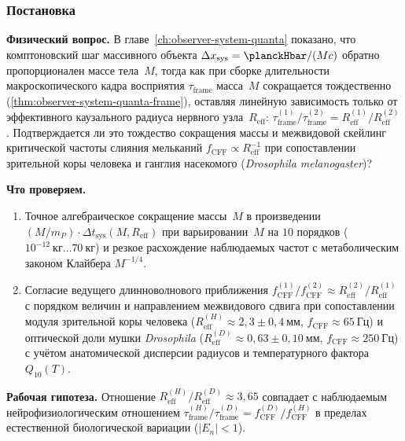 \label{exp:ceo01}

\subsubsection*{Постановка}
\textbf{Физический вопрос.}
В главе~\ref{ch:observer-system-quanta} показано, что комптоновский шаг массивного объекта $\Delta x_{\mathrm{sys}} = \planckHbar/(M c)$ обратно пропорционален массе тела~$M$, тогда как при сборке длительности макроскопического кадра восприятия $\tau_{\mathrm{frame}}$ масса~$M$ сокращается тождественно (\cref{thm:observer-system-quanta-frame}), оставляя линейную зависимость только от эффективного каузального радиуса нервного узла~$R_{\mathrm{eff}}$: $\tau_{\mathrm{frame}}^{(1)}/\tau_{\mathrm{frame}}^{(2)} = R_{\mathrm{eff}}^{(1)}/R_{\mathrm{eff}}^{(2)}$.
Подтверждается ли это тождество сокращения массы и межвидовой скейлинг критической частоты слияния мельканий $f_{\mathrm{CFF}} \propto R_{\mathrm{eff}}^{-1}$ при сопоставлении зрительной коры человека и ганглия насекомого (\emph{Drosophila melanogaster})?

\textbf{Что проверяем.}
\begin{enumerate}[label=\textbf{(\alph*)},leftmargin=*,itemsep=0.25em]
\item Точное алгебраическое сокращение массы~$M$ в произведении $(M/m_P)\cdot \Delta t_{\mathrm{sys}}(M, R_{\mathrm{eff}})$ при варьировании~$M$ на $10$ порядков ($10^{-12}\ \mathrm{кг}\ldots 70\ \mathrm{кг}$) и резкое расхождение наблюдаемых частот с метаболическим законом Клайбера $M^{-1/4}$.
\item Согласие ведущего длинноволнового приближения $f_{\mathrm{CFF}}^{(1)}/f_{\mathrm{CFF}}^{(2)} \approx R_{\mathrm{eff}}^{(2)}/R_{\mathrm{eff}}^{(1)}$ с порядком величин и направлением межвидового сдвига при сопоставлении модуля зрительной коры человека ($R_{\mathrm{eff}}^{(H)} \approx 2{,}3 \pm 0{,}4\ \mathrm{мм}$, $f_{\mathrm{CFF}} \approx 65\ \mathrm{Гц}$) и оптической доли мушки \emph{Drosophila} ($R_{\mathrm{eff}}^{(D)} \approx 0{,}63 \pm 0{,}10\ \mathrm{мм}$, $f_{\mathrm{CFF}} \approx 250\ \mathrm{Гц}$) с учётом анатомической дисперсии радиусов и температурного фактора $Q_{10}(T)$.
\end{enumerate}

\textbf{Рабочая гипотеза.}
Отношение $R_{\mathrm{eff}}^{(H)}/R_{\mathrm{eff}}^{(D)} \approx 3{,}65$ совпадает с наблюдаемым нейрофизиологическим отношением $\tau_{\mathrm{frame}}^{(H)}/\tau_{\mathrm{frame}}^{(D)} = f_{\mathrm{CFF}}^{(D)}/f_{\mathrm{CFF}}^{(H)}$ в пределах естественной биологической вариации ($|E_n| < 1$).

